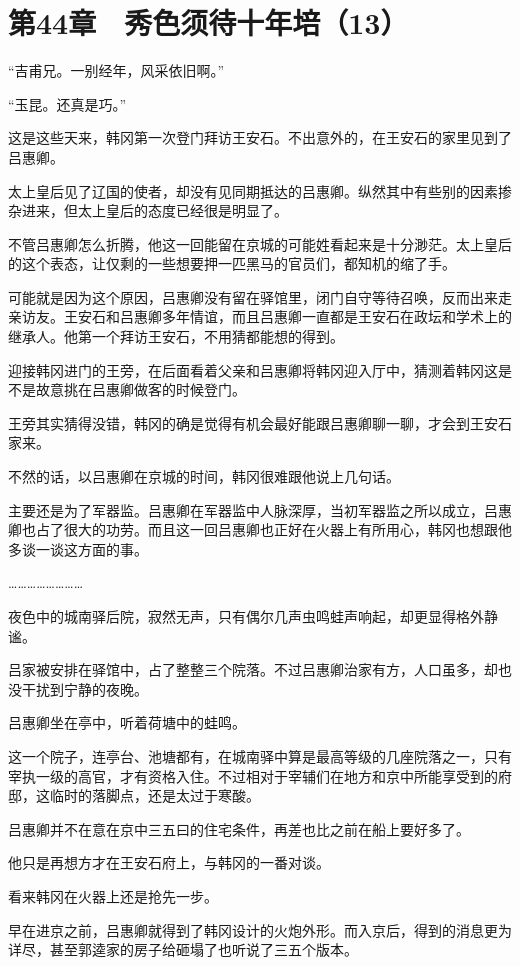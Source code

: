 \section{第44章　秀色须待十年培（13）}

“吉甫兄。一别经年，风采依旧啊。”

“玉昆。还真是巧。”

这是这些天来，韩冈第一次登门拜访王安石。不出意外的，在王安石的家里见到了吕惠卿。

太上皇后见了辽国的使者，却没有见同期抵达的吕惠卿。纵然其中有些别的因素掺杂进来，但太上皇后的态度已经很是明显了。

不管吕惠卿怎么折腾，他这一回能留在京城的可能姓看起来是十分渺茫。太上皇后的这个表态，让仅剩的一些想要押一匹黑马的官员们，都知机的缩了手。

可能就是因为这个原因，吕惠卿没有留在驿馆里，闭门自守等待召唤，反而出来走亲访友。王安石和吕惠卿多年情谊，而且吕惠卿一直都是王安石在政坛和学术上的继承人。他第一个拜访王安石，不用猜都能想的得到。

迎接韩冈进门的王旁，在后面看着父亲和吕惠卿将韩冈迎入厅中，猜测着韩冈这是不是故意挑在吕惠卿做客的时候登门。

王旁其实猜得没错，韩冈的确是觉得有机会最好能跟吕惠卿聊一聊，才会到王安石家来。

不然的话，以吕惠卿在京城的时间，韩冈很难跟他说上几句话。

主要还是为了军器监。吕惠卿在军器监中人脉深厚，当初军器监之所以成立，吕惠卿也占了很大的功劳。而且这一回吕惠卿也正好在火器上有所用心，韩冈也想跟他多谈一谈这方面的事。

……………………

夜色中的城南驿后院，寂然无声，只有偶尔几声虫鸣蛙声响起，却更显得格外静谧。

吕家被安排在驿馆中，占了整整三个院落。不过吕惠卿治家有方，人口虽多，却也没干扰到宁静的夜晚。

吕惠卿坐在亭中，听着荷塘中的蛙鸣。

这一个院子，连亭台、池塘都有，在城南驿中算是最高等级的几座院落之一，只有宰执一级的高官，才有资格入住。不过相对于宰辅们在地方和京中所能享受到的府邸，这临时的落脚点，还是太过于寒酸。

吕惠卿并不在意在京中三五曰的住宅条件，再差也比之前在船上要好多了。

他只是再想方才在王安石府上，与韩冈的一番对谈。

看来韩冈在火器上还是抢先一步。

早在进京之前，吕惠卿就得到了韩冈设计的火炮外形。而入京后，得到的消息更为详尽，甚至郭逵家的房子给砸塌了也听说了三五个版本。

